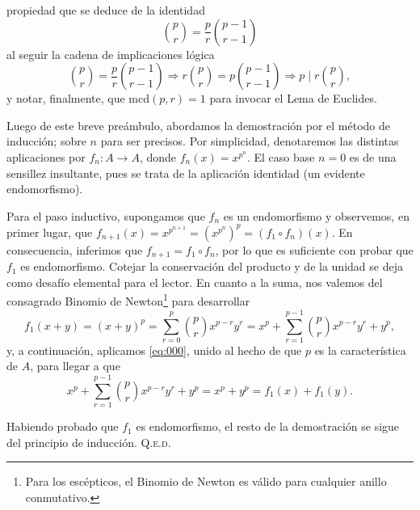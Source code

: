 \documentclass{article}
\newcommand{\mcd}{\text{mcd}}
\begin{document}
\begin{enumerate}
    propiedad que se deduce de la identidad \[\binom{p}{r} = \frac{p}{r} \binom{p - 1}{r - 1}\] al seguir la cadena de implicaciones lógica \[\binom{p}{r} = \frac{p}{r} \binom{p - 1}{r - 1} \Rightarrow r\binom{p}{r} = p \binom{p - 1}{r - 1} \Rightarrow p \mid r \binom{p}{r},\] y notar, finalmente, que $\mcd(p, r) = 1$ para invocar el Lema de Euclides.

    Luego de este breve preámbulo, abordamos la demostración por el método de inducción; sobre $n$ para ser precisos. Por simplicidad, denotaremos las distintas aplicaciones por $f_n : A \to A$, donde $f_n(x) = x^{p^n}$. El caso base $n = 0$ es de una sensillez insultante, pues se trata de la aplicación identidad (un evidente endomorfismo). 
    
    Para el paso inductivo, supongamos que $f_n$ es un endomorfismo y observemos, en primer lugar, que $f_{n + 1}(x) = x^{p^{n + 1}} = (x^{p^n})^p = (f_1 \circ f_n)(x)$. En consecuencia, inferimos que $f_{n + 1} = f_1 \circ f_n$, por lo que es suficiente con probar que $f_1$ es endomorfismo. Cotejar la conservación del producto y de la unidad se deja como desafío elemental para el lector. En cuanto a la suma, nos valemos del consagrado Binomio de Newton\footnote{Para los escépticos, el Binomio de Newton es válido para cualquier anillo conmutativo.} para desarrollar \[f_1(x + y) = (x + y)^p = \sum_{r=0}^{p} \binom{p}{r} x^{p-r}y^r = x^p + \sum_{r=1}^{p-1} \binom{p}{r}x^{p-r}y^r + y^p,\] y, a continuación, aplicamos \eqref{eq:000}, unido al hecho de que $p$ es la característica de $A$, para llegar a que \[x^p + \sum_{r=1}^{p-1} \binom{p}{r}x^{p-r}y^r + y^p = x^p + y^p = f_1(x) + f_1(y).\]

    Habiendo probado que $f_1$ es endomorfismo, el resto de la demostración se sigue del principio de inducción. \hfill{\textsc{Q.e.d.}}
\end{enumerate}
\end{document}
